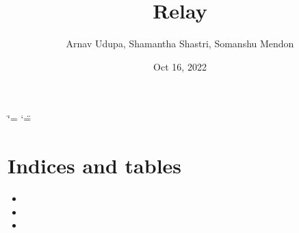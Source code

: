 \documentclass[letterpaper,10pt,english]{sphinxmanual}
\title{Relay}
\date{Oct 16, 2022}
\author{Arnav Udupa, Shamantha Shastri, Somanshu Mendon}
\begin{document}
\ifdefined\shorthandoff
  \ifnum\catcode`\=\string=\active\shorthandoff{=}\fi
  \ifnum\catcode`\"=\active{}\fi
\fi

\pagestyle{empty}
\sphinxmaketitle
\pagestyle{plain}
\sphinxtableofcontents
\pagestyle{normal}
\label{\detokenize{index::doc}}



\chapter{Indices and tables}
\label{\detokenize{index:indices-and-tables}}\begin{itemize}
\item {} 
\sphinxAtStartPar
{}

\item {} 
\sphinxAtStartPar
{}

\item {} 
\sphinxAtStartPar
{}

\end{itemize}



\renewcommand{\indexname}{Index}
\printindex
\end{document}
